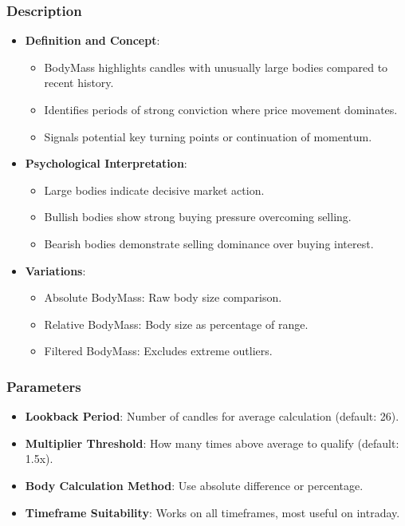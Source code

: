 \documentclass[12pt]{article}
\begin{document}
\subsubsection{Description}
\begin{itemize}
\item \textbf{Definition and Concept}:
  \begin{itemize}
  \item BodyMass highlights candles with unusually large bodies compared to recent history.
  \item Identifies periods of strong conviction where price movement dominates.
  \item Signals potential key turning points or continuation of momentum.
  \end{itemize}
\item \textbf{Psychological Interpretation}:
  \begin{itemize}
  \item Large bodies indicate decisive market action.
  \item Bullish bodies show strong buying pressure overcoming selling.
  \item Bearish bodies demonstrate selling dominance over buying interest.
  \end{itemize}
\item \textbf{Variations}:
  \begin{itemize}
  \item Absolute BodyMass: Raw body size comparison.
  \item Relative BodyMass: Body size as percentage of range.
  \item Filtered BodyMass: Excludes extreme outliers.
  \end{itemize}
\end{itemize}

\subsubsection{Parameters}
\begin{itemize}
\item \textbf{Lookback Period}: Number of candles for average calculation (default: 26).
\item \textbf{Multiplier Threshold}: How many times above average to qualify (default: 1.5x).
\item \textbf{Body Calculation Method}: Use absolute difference or percentage.
\item \textbf{Timeframe Suitability}: Works on all timeframes, most useful on intraday.
\end{itemize}
\end{document}
